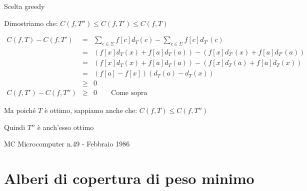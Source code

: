 \begin{frame}[shrink=5]{Scelta greedy}

\BIL
\item Dimostriamo che: $C(f,T'') \leq C(f, T') \leq C(f,T)$

\begin{eqnarray*}
C(f,T) - C(f,T') &=& \sum_{c \in \Sigma} f[c]d_T(c) - \sum_{c \in \Sigma} f[c]d_{T'}(c) \\
             &=& (f[x]d_T(x)+f[a]d_T(a)) - (f[x]d_{T'}(x)+f[a]d_{T'}(a)) \\
             &=& (f[x]d_T(x)+f[a]d_T(a)) - (f[x]d_{T}(a)+f[a]d_{T}(x)) \\
             &=& (f[a]-f[x])(d_T(a)-d_T(x)) \\
             &\geq& 0 \\
C(f,T') - C(f,T'') &\geq& 0 \qquad \textrm{Come sopra}
\end{eqnarray*}

\item Ma poiché $T$ è ottimo, sappiamo anche che: $C(f,T) \leq C(f,T'')$
\item Quindi $T''$ è anch'esso ottimo
\EIL

\end{frame}

\begin{OnlySlides}{MC Microcomputer n.49 - Febbraio 1986}


\end{OnlySlides}

\section{Alberi di copertura di peso minimo}

